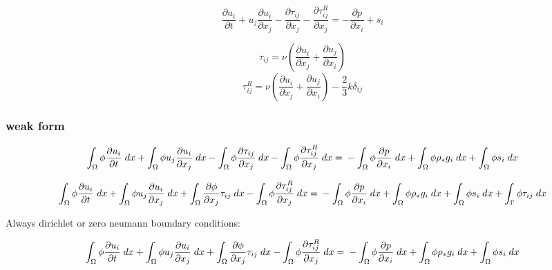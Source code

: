\documentclass[11pt,a4paper]{article}
\begin{document}
\begin{dmath}
  \frac{\partial u_i}{\partial t} + u_j \frac{\partial u_i}{\partial x_j} - \frac{\partial \tau_{ij}}{\partial x_j} - \frac{\partial \tau_{ij}^R}{\partial x_j} = - \frac{\partial p}{\partial x_i} + s_i
\end{dmath}

\begin{dmath}
  \tau_{ij} = \nu \left( \frac{\partial u_i}{\partial x_j} + \frac{\partial u_j}{\partial x_i} \right)
\end{dmath}
\begin{dmath}
  \tau_{ij}^R = \nu \left( \frac{\partial u_i}{\partial x_j} + \frac{\partial u_j}{\partial x_i} \right) - \frac{2}{3} k \delta_{ij}
\end{dmath}

\subsubsection{weak form}

\begin{dmath}
  \int_\Omega \phi \frac{\partial u_i}{\partial t} \; dx + \int_\Omega \phi u_j \frac{\partial u_i}{\partial x_j} \; dx - \int_\Omega \phi \frac{\partial \tau_{ij}}{\partial x_j} \; dx - \int_\Omega \phi \frac{\partial \tau_{ij}^R}{\partial x_j} \; dx = \\ - \int_\Omega \phi \frac{\partial p}{\partial x_i} \; dx + \int_\Omega \phi \rho_* g_i \; dx + \int_\Omega \phi s_i \; dx
\end{dmath}

\begin{dmath}
  \int_\Omega \phi \frac{\partial u_i}{\partial t} \; dx + \int_\Omega \phi u_j \frac{\partial u_i}{\partial x_j} \; dx + \int_\Omega \frac{\partial \phi}{\partial x_j} \tau_{ij} \; dx - \int_\Omega \phi \frac{\partial \tau_{ij}^R}{\partial x_j} \; dx = \\ - \int_\Omega \phi \frac{\partial p}{\partial x_i} \; dx + \int_\Omega \phi \rho_* g_i \; dx + \int_\Omega \phi s_i \; dx + \int_\Upgamma \phi \tau_{ij} \; dx
\end{dmath}

Always dirichlet or zero neumann boundary conditions:

\begin{dmath}
  \int_\Omega \phi \frac{\partial u_i}{\partial t} \; dx + \int_\Omega \phi u_j \frac{\partial u_i}{\partial x_j} \; dx + \int_\Omega \frac{\partial \phi}{\partial x_j} \tau_{ij} \; dx - \int_\Omega \phi \frac{\partial \tau_{ij}^R}{\partial x_j} \; dx = \\ - \int_\Omega \phi \frac{\partial p}{\partial x_i} \; dx + \int_\Omega \phi \rho_* g_i \; dx + \int_\Omega \phi s_i \; dx
\end{dmath}
\end{document}

